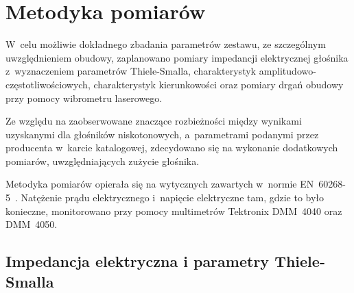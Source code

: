 \documentclass[12pt]{oska}
\begin{document}
	
	\section{Metodyka pomiarów}
	
	W~celu możliwie dokładnego zbadania parametrów zestawu, ze szczególnym uwzględnieniem obudowy, zaplanowano pomiary impedancji elektrycznej głośnika z~wyznaczeniem parametrów Thiele-Smalla, charakterystyk amplitudowo-częstotliwościowych, charakterystyk kierunkowości oraz pomiary drgań obudowy przy pomocy wibrometru laserowego.
	
	Ze względu na zaobserwowane znaczące rozbieżności między wynikami uzyskanymi dla głośników niskotonowych, a~parametrami podanymi przez producenta w~karcie katalogowej, zdecydowano się na wykonanie dodatkowych pomiarów, uwzględniających zużycie głośnika.
	
	Metodyka pomiarów opierała się na wytycznych zawartych w~normie EN~60268-5~\cite{norma}. Natężenie prądu elektrycznego i~napięcie elektryczne tam, gdzie to było konieczne, monitorowano przy pomocy multimetrów Tektronix DMM~4040 oraz DMM~4050.
	
	\subsection{Impedancja elektryczna i parametry Thiele-Smalla}
	
\end{document}
